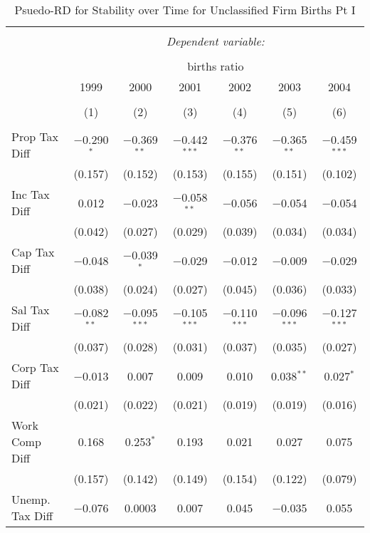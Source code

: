 
\begin{table}[!htbp] \centering 
  \caption{Psuedo-RD for Stability over Time for  Unclassified Firm Births Pt I} 
  \label{99year} 
\small 
\begin{tabular}{@{\extracolsep{5pt}}lcccccc} 
\\[-1.8ex]\hline 
\hline \\[-1.8ex] 
 & \multicolumn{6}{c}{\textit{Dependent variable:}} \\ 
\cline{2-7} 
\\[-1.8ex] & \multicolumn{6}{c}{births ratio} \\ 
 & 1999 & 2000 & 2001 & 2002 & 2003 & 2004 \\ 
\\[-1.8ex] & (1) & (2) & (3) & (4) & (5) & (6)\\ 
\hline \\[-1.8ex] 
 Prop Tax Diff & $-$0.290$^{*}$ & $-$0.369$^{**}$ & $-$0.442$^{***}$ & $-$0.376$^{**}$ & $-$0.365$^{**}$ & $-$0.459$^{***}$ \\ 
  & (0.157) & (0.152) & (0.153) & (0.155) & (0.151) & (0.102) \\ 
  Inc Tax Diff & 0.012 & $-$0.023 & $-$0.058$^{**}$ & $-$0.056 & $-$0.054 & $-$0.054 \\ 
  & (0.042) & (0.027) & (0.029) & (0.039) & (0.034) & (0.034) \\ 
  Cap Tax Diff & $-$0.048 & $-$0.039$^{*}$ & $-$0.029 & $-$0.012 & $-$0.009 & $-$0.029 \\ 
  & (0.038) & (0.024) & (0.027) & (0.045) & (0.036) & (0.033) \\ 
  Sal Tax Diff & $-$0.082$^{**}$ & $-$0.095$^{***}$ & $-$0.105$^{***}$ & $-$0.110$^{***}$ & $-$0.096$^{***}$ & $-$0.127$^{***}$ \\ 
  & (0.037) & (0.028) & (0.031) & (0.037) & (0.035) & (0.027) \\ 
  Corp Tax Diff & $-$0.013 & 0.007 & 0.009 & 0.010 & 0.038$^{**}$ & 0.027$^{*}$ \\ 
  & (0.021) & (0.022) & (0.021) & (0.019) & (0.019) & (0.016) \\ 
  Work Comp Diff & 0.168 & 0.253$^{*}$ & 0.193 & 0.021 & 0.027 & 0.075 \\ 
  & (0.157) & (0.142) & (0.149) & (0.154) & (0.122) & (0.079) \\ 
  Unemp. Tax Diff & $-$0.076 & 0.0003 & 0.007 & 0.045 & $-$0.035 & 0.055 \\ 

\end{tabular}
\end{table}
